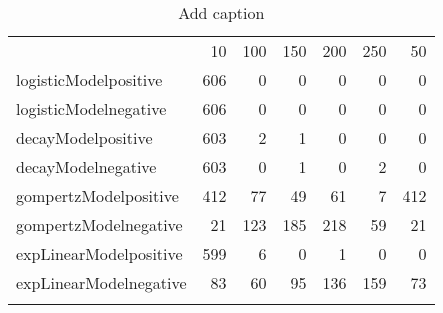 \begin{table}[htbp]
  \centering
  \caption{Add caption}
    \begin{tabular}{rrrrrrr}
          & 10    & 100   & 150   & 200   & 250   & 50 \\
    \multicolumn{1}{l}{logisticModelpositive} & 606   & 0     & 0     & 0     & 0     & 0 \\
    \multicolumn{1}{l}{logisticModelnegative} & 606   & 0     & 0     & 0     & 0     & 0 \\
    \multicolumn{1}{l}{decayModelpositive} & 603   & 2     & 1     & 0     & 0     & 0 \\
    \multicolumn{1}{l}{decayModelnegative} & 603   & 0     & 1     & 0     & 2     & 0 \\
    \multicolumn{1}{l}{gompertzModelpositive} & 412   & 77    & 49    & 61    & 7     & 412 \\
    \multicolumn{1}{l}{gompertzModelnegative} & 21    & 123   & 185   & 218   & 59    & 21 \\
    \multicolumn{1}{l}{expLinearModelpositive} & 599   & 6     & 0     & 1     & 0     & 0 \\
    \multicolumn{1}{l}{expLinearModelnegative} & 83    & 60    & 95    & 136   & 159   & 73 \\
          &       &       &       &       &       &  \\
    \end{tabular}%
  \label{tab:addlabel}%
\end{table}%
